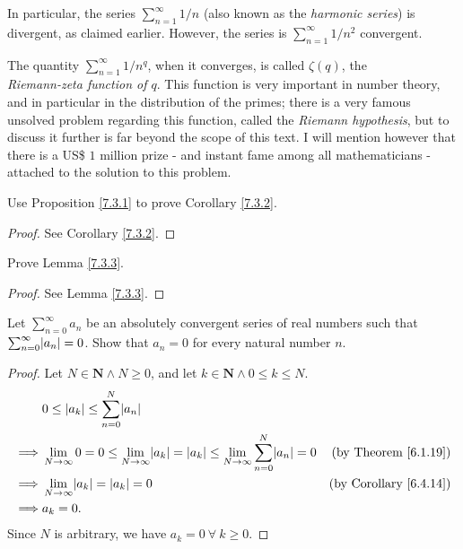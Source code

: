 \begin{note}
In particular, the series \(\sum_{n = 1}^\infty 1 / n\) (also known as the \emph{harmonic series}) is divergent, as claimed earlier.
However, the series is \(\sum_{n = 1}^\infty 1 / n^2\) convergent.
\end{note}

\begin{remark}\label{7.3.8}
The quantity \(\sum_{n = 1}^\infty 1 / n^q\), when it converges, is called \(\zeta(q)\), the \\
\emph{Riemann-zeta function of \(q\)}.
This function is very important in number theory, and in particular in the distribution of the primes;
there is a very famous unsolved problem regarding this function, called the \emph{Riemann hypothesis}, but to discuss it further is far beyond the scope of this text.
I will mention however that there is a US\$ \(1\) million prize
- and instant fame among all mathematicians -
attached to the solution to this problem.
\end{remark}

\exercisesection

\begin{exercise}\label{ex 7.3.1}
Use Proposition \ref{7.3.1} to prove Corollary \ref{7.3.2}.
\end{exercise}

\begin{proof}
See Corollary \ref{7.3.2}.
\end{proof}

\begin{exercise}\label{ex 7.3.2}
Prove Lemma \ref{7.3.3}.
\end{exercise}

\begin{proof}
See Lemma \ref{7.3.3}.
\end{proof}

\begin{exercise}\label{ex 7.3.3}
Let \(\sum_{n = 0}^\infty a_n\) be an absolutely convergent series of real numbers such that \(\sum_{n = 0}^\infty \abs*{a_n} = 0\).
Show that \(a_n = 0\) for every natural number \(n\).
\end{exercise}

\begin{proof}
Let \(N \in \mathbf{N} \land N \geq 0\), and let \(k \in \mathbf{N} \land 0 \leq k \leq N\).
\begin{align*}
& 0 \leq \abs*{a_k} \leq \sum_{n = 0}^N \abs*{a_n} \\
\implies & \lim_{N \to \infty} 0 = 0 \leq \lim_{N \to \infty} \abs*{a_k} = \abs*{a_k} \leq \lim_{N \to \infty} \sum_{n = 0}^N \abs*{a_n} = 0 & \text{(by Theorem \ref{6.1.19})} \\
\implies & \lim_{N \to \infty} \abs*{a_k} = \abs*{a_k} = 0 & \text{(by Corollary \ref{6.4.14})} \\
\implies & a_k = 0.
\end{align*}
Since \(N\) is arbitrary, we have \(a_k = 0 \ \forall\ k \geq 0\).
\end{proof}